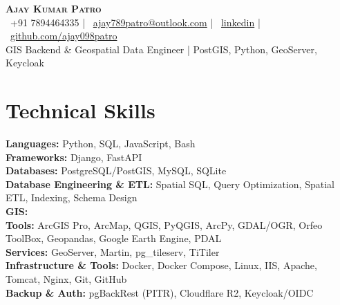 \documentclass[letterpaper,11pt]{article}
\begin{document}
\vspace{-80pt}
\begin{center}
    \textbf{\Huge \scshape Ajay Kumar Patro} \\ \vspace{1pt}
    \small
    \faPhone\ +91 7894464335 \quad | \quad
    \faEnvelope\ \href{mailto:ajay789patro@outlook.com}{ajay789patro@outlook.com} \quad | \quad
    \faLinkedin\ \href{https://www.linkedin.com/in/ajay-patro-933659190/}{linkedin} \quad | \quad
    \faGithub\ \href{https://github.com/ajay098patro}{github.com/ajay098patro} \\ \vspace{2pt}
    GIS Backend \& Geospatial Data Engineer \quad | \quad PostGIS, Python, GeoServer, Keycloak
\end{center}
\vspace{-16pt}

 
\section{Technical Skills}
 \begin{itemize}[leftmargin=0.15in, label={}]
    \small{\item{
     \textbf{Languages:}{ Python, SQL, JavaScript, Bash} \\
     \textbf{Frameworks:}{ Django, FastAPI} \\
     \textbf{Databases:}{ PostgreSQL/PostGIS, MySQL, SQLite} \\
     \textbf{Database Engineering \& ETL:}{ Spatial SQL, Query Optimization, Spatial ETL, Indexing, Schema Design} \\
     \textbf{GIS:}{ \\
        \hspace{1em}\textbf{Tools:}{ ArcGIS Pro, ArcMap, QGIS, PyQGIS, ArcPy, GDAL/OGR, Orfeo ToolBox, Geopandas, Google Earth Engine, PDAL}\\
        \hspace{1em}\textbf{Services:}{ GeoServer, Martin, pg\_tileserv, TiTiler}
     } \\
     \textbf{Infrastructure \& Tools:}{ Docker, Docker Compose, Linux, IIS, Apache, Tomcat, Nginx, Git, GitHub} \\
     \textbf{Backup \& Auth:}{ pgBackRest (PITR), Cloudflare R2, Keycloak/OIDC}
    }}
 \end{itemize}

 \vspace{-19pt}
\end{document}
